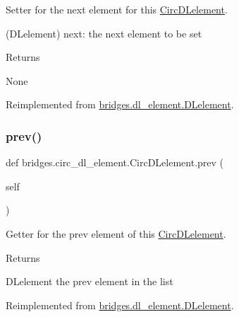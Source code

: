 Setter for the next element for this \mbox{\hyperlink{classbridges_1_1circ__dl__element_1_1_circ_d_lelement}{Circ\+D\+Lelement}}. 

\begin{DoxyVerb}       (DLelement) next: the next element to be set
\end{DoxyVerb}
 \begin{DoxyReturn}{Returns}


None 
\end{DoxyReturn}


Reimplemented from \mbox{\hyperlink{classbridges_1_1dl__element_1_1_d_lelement_ae46f630cd7384689d4305770e6b2c7c1}{bridges.\+dl\+\_\+element.\+D\+Lelement}}.

\mbox{\label{classbridges_1_1circ__dl__element_1_1_circ_d_lelement_aa2ebe17f407680a6a4fc886ef9516d61}} 
\subsubsection{\texorpdfstring{prev()}{prev()}\hspace{0.1cm}{\footnotesize\ttfamily [1/2]}}
{\footnotesize\ttfamily def bridges.\+circ\+\_\+dl\+\_\+element.\+Circ\+D\+Lelement.\+prev (\begin{DoxyParamCaption}\item[{}]{self }\end{DoxyParamCaption})}



Getter for the prev element of this \mbox{\hyperlink{classbridges_1_1circ__dl__element_1_1_circ_d_lelement}{Circ\+D\+Lelement}}. 

\begin{DoxyReturn}{Returns}


D\+Lelement the prev element in the list 
\end{DoxyReturn}


Reimplemented from \mbox{\hyperlink{classbridges_1_1dl__element_1_1_d_lelement_a66e7c4bfb2216a68744fe58c24e9917f}{bridges.\+dl\+\_\+element.\+D\+Lelement}}.

\mbox{\label{classbridges_1_1circ__dl__element_1_1_circ_d_lelement_a0c61c5aefd9fb24c320e9f879d5a2e10}} 
